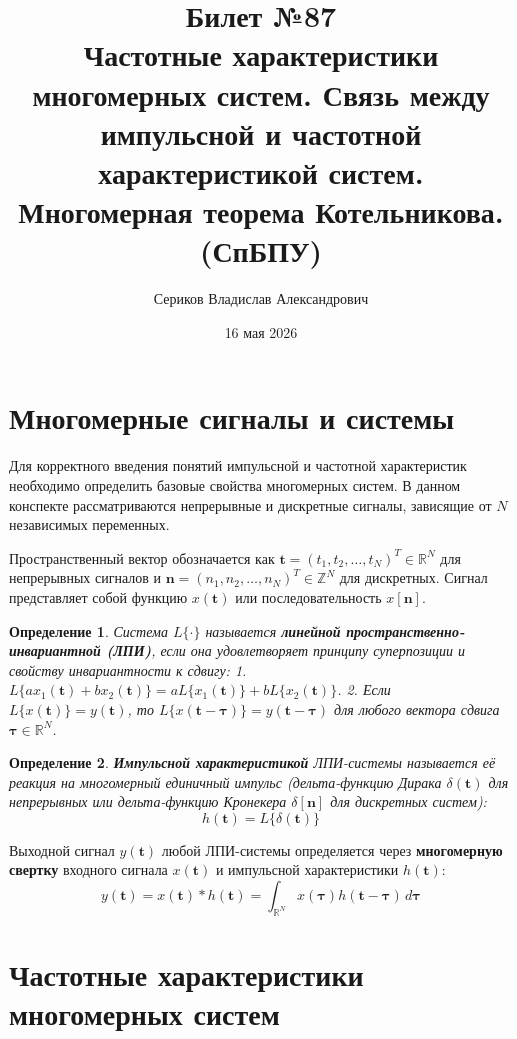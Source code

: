 \documentclass[12pt,a4paper]{article}
\title{Билет №87 \\ \small Частотные характеристики многомерных систем. Связь между импульсной и частотной характеристикой систем. Многомерная теорема Котельникова. (СпБПУ)}
\author{Сериков Владислав Александрович}
\date{16 мая 2026}
\newtheorem{definition}{Определение}
\newcommand{\vect}[1]{\mathbf{#1}}
\begin{document}
\maketitle
\tableofcontents
\newpage

\section{Многомерные сигналы и системы}

Для корректного введения понятий импульсной и частотной характеристик необходимо определить базовые свойства многомерных систем. В данном конспекте рассматриваются непрерывные и дискретные сигналы, зависящие от $N$ независимых переменных.

Пространственный вектор обозначается как $\vect{t} = (t_1, t_2, \dots, t_N)^T \in \mathbb{R}^N$ для непрерывных сигналов и $\vect{n} = (n_1, n_2, \dots, n_N)^T \in \mathbb{Z}^N$ для дискретных. Сигнал представляет собой функцию $x(\vect{t})$ или последовательность $x[\vect{n}]$.

\begin{definition}
Система $L\{\cdot\}$ называется \textbf{линейной пространственно-инвариантной (ЛПИ)}, если она удовлетворяет принципу суперпозиции и свойству инвариантности к сдвигу:
1. $L\{a x_1(\vect{t}) + b x_2(\vect{t})\} = a L\{x_1(\vect{t})\} + b L\{x_2(\vect{t})\}$.
2. Если $L\{x(\vect{t})\} = y(\vect{t})$, то $L\{x(\vect{t} - \vect{\tau})\} = y(\vect{t} - \vect{\tau})$ для любого вектора сдвига $\vect{\tau} \in \mathbb{R}^N$.
\end{definition}

\begin{definition}
\textbf{Импульсной характеристикой} ЛПИ-системы называется её реакция на многомерный единичный импульс (дельта-функцию Дирака $\delta(\vect{t})$ для непрерывных или дельта-функцию Кронекера $\delta[\vect{n}]$ для дискретных систем):
$$ h(\vect{t}) = L\{\delta(\vect{t})\} $$
\end{definition}

Выходной сигнал $y(\vect{t})$ любой ЛПИ-системы определяется через \textbf{многомерную свертку} входного сигнала $x(\vect{t})$ и импульсной характеристики $h(\vect{t})$:
\begin{equation}
y(\vect{t}) = x(\vect{t}) * h(\vect{t}) = \int_{\mathbb{R}^N} x(\vect{\tau}) h(\vect{t} - \vect{\tau}) \, d\vect{\tau}
\end{equation}

\section{Частотные характеристики многомерных систем}
\end{document}
